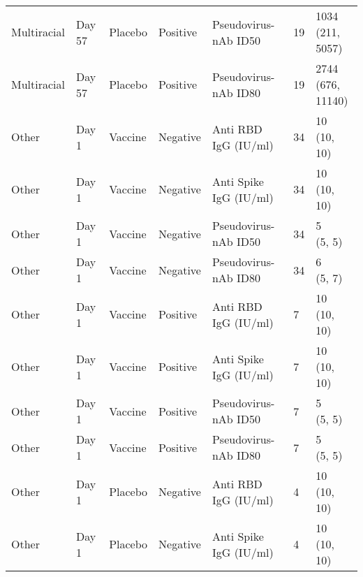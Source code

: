 \documentclass[]{book}
\theoremstyle{definition}
\theoremstyle{definition}
\theoremstyle{definition}
\newcommand{\1}{\mathbbm{1}}
\begin{document}
\begin{landscape}
\begin{ThreePartTable}
\begin{longtable}[t]{>{\raggedright\arraybackslash}p{7cm}llllll}
\hspace{1em}Multiracial & Day 57 & Placebo & Positive & Pseudovirus-nAb ID50 & 19 & \makecell[l]{1034\\(211, 5057)}\\
\hspace{1em}Multiracial & Day 57 & Placebo & Positive & Pseudovirus-nAb ID80 & 19 & \makecell[l]{2744\\(676, 11140)}\\
\hspace{1em}Other & Day 1 & Vaccine & Negative & Anti RBD IgG (IU/ml) & 34 & \makecell[l]{10\\(10, 10)}\\
\hspace{1em}Other & Day 1 & Vaccine & Negative & Anti Spike IgG (IU/ml) & 34 & \makecell[l]{10\\(10, 10)}\\
\hspace{1em}Other & Day 1 & Vaccine & Negative & Pseudovirus-nAb ID50 & 34 & \makecell[l]{5\\(5, 5)}\\
\hspace{1em}Other & Day 1 & Vaccine & Negative & Pseudovirus-nAb ID80 & 34 & \makecell[l]{6\\(5, 7)}\\
\hspace{1em}Other & Day 1 & Vaccine & Positive & Anti RBD IgG (IU/ml) & 7 & \makecell[l]{10\\(10, 10)}\\
\hspace{1em}Other & Day 1 & Vaccine & Positive & Anti Spike IgG (IU/ml) & 7 & \makecell[l]{10\\(10, 10)}\\
\hspace{1em}Other & Day 1 & Vaccine & Positive & Pseudovirus-nAb ID50 & 7 & \makecell[l]{5\\(5, 5)}\\
\hspace{1em}Other & Day 1 & Vaccine & Positive & Pseudovirus-nAb ID80 & 7 & \makecell[l]{5\\(5, 5)}\\
\hspace{1em}Other & Day 1 & Placebo & Negative & Anti RBD IgG (IU/ml) & 4 & \makecell[l]{10\\(10, 10)}\\
\hspace{1em}Other & Day 1 & Placebo & Negative & Anti Spike IgG (IU/ml) & 4 & \makecell[l]{10\\(10, 10)}\\

\end{longtable}
\end{ThreePartTable}
\end{landscape}
\end{document}
